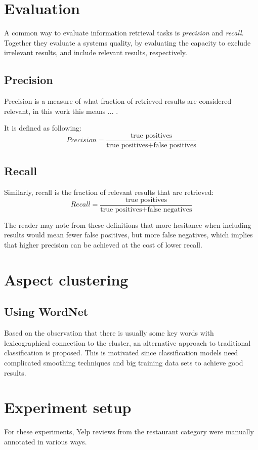 \documentclass[a4paper,11pt]{kth-mag}
\newcommand{\todo}{ ... }
\newcommand{\category}{restaurant category }  %
\begin{document}
\section{Evaluation}
A common way to evaluate information retrieval tasks is \emph{precision} and \emph{recall}. Together they evaluate a systems quality, by evaluating the capacity to exclude irrelevant results, and include relevant results, respectively.

\subsection{Precision}
Precision is a measure of what fraction of retrieved results are considered relevant, in this work this means \todo.

It is defined as following:
$$Precision = \frac{\text {true positives}}{\text{true positives} + \text{false positives}}$$

\subsection{Recall}
Similarly, recall is the fraction of relevant results that are retrieved:
$$Recall = \frac{\text {true positives}}{\text{true positives} + \text{false negatives}}$$

The reader may note from these definitions that more hesitance when including results would mean fewer false positives, but more false negatives, which implies that higher precision can be achieved at the cost of lower recall.

\section{Aspect clustering}
\subsection{Using WordNet}
Based on the observation that there is usually some key words with lexicographical connection to the cluster, an alternative approach to traditional classification is proposed. This is motivated since classification models need complicated smoothing techniques and big training data sets to achieve good results.


\section{Experiment setup}
For these experiments, Yelp reviews from the \category were manually annotated in various ways.
\end{document}
